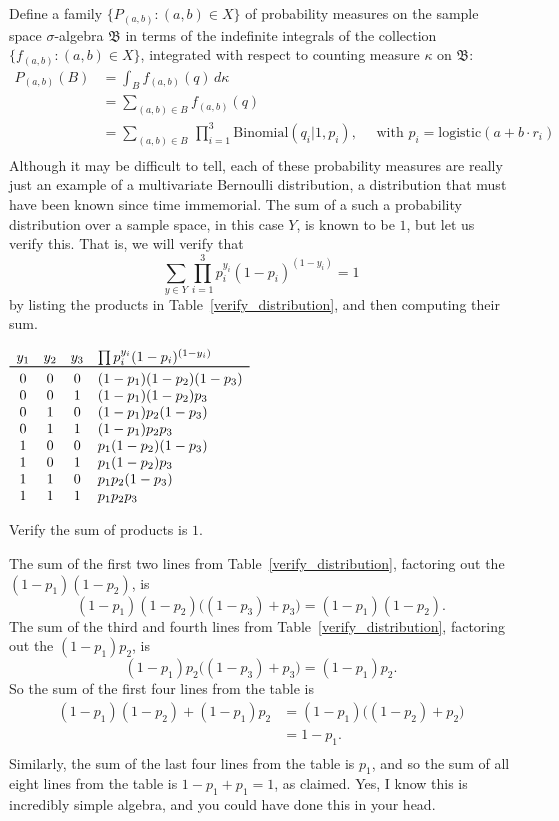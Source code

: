 \documentclass[
twoside=true,
paper=letter,
fontsize=9pt,
pagesize=auto,
leqno,
openany,
headsepline,
overfullrule,
]{scrbook}
\theoremstyle{plain}
\theoremstyle{plain}
\theoremstyle{definition}
\theoremstyle{bfnoteitalic}
\theoremstyle{bfnoteroman}
\newcommand{\sigalg}[1]{\mathfrak{#1}}
\newcommand{\textsigma}{\hbox{\large{$\sigma$}}\kern-1pt}
\newcommand{\funcf}{f}
\newcommand{\function}{f}
\newcommand{\measurespace}{X}
\newcommand{\measurespaceii}{Y}
\newcommand{\setii}{B}
\newcommand{\pspace}{\measurespace}%
\newcommand{\sspace}{\measurespaceii}%
\newcommand{\sspacesig}{\sigalg{B}}
\begin{document}
Define a family $\{P_{(a,b)}:(a,b)\in\pspace\}$ of probability measures on the sample space \textsigma-algebra
$\sspacesig$ in terms of the indefinite integrals of the collection
$\{ \function_{(a,b)} : (a,b)\in\pspace \}$, integrated with respect to counting measure $\kappa$ on
$\sspacesig$:
\begin{align*}
P_{(a,b)} (\setii)
& =
\int_\setii \funcf_{(a,b)}(q)\, d\kappa \\
& =
\sum_{(a,b)\in\setii} f_{(a,b)}(q) \\
& =
\sum_{(a,b)\in\setii}
\,
\prod_{i=1}^{3}
\text{Binomial}(q_i \vert 1, p_i),\quad
\text{ with $p_i = \text{logistic}(a  + b\cdot r_i )$} \\
\end{align*}
Although it may be difficult to tell, each of these probability measures are really just an example of a  multivariate Bernoulli distribution, a distribution that must have been known since time immemorial.  The sum of a such a probability distribution over a sample space, in this case $\sspace$, is known to be $1$, but let us verify this.
That is, we will verify that
\[
\sum_{y\in Y}\prod_{i=1}^3 p_i^{y_i}(1-p_i)^{(1-y_i)}
=
1
\]
by listing the products in Table~\ref{verify_distribution}, and then computing their sum.
\begin{table}
\centering
\renewcommand{\arraystretch}{1.1}
$\begin{array}{cccl}
y_1 & y_2 & y_3 & \prod p_i^{y_i} (1-p_i)^{(1-y_i)} \\
\toprule
0 & 0 & 0 & (1-p_1)(1-p_2)(1-p_3) \\
0 & 0 & 1 & (1-p_1)(1-p_2)p_3 \\
0 & 1 & 0 & (1-p_1)p_2(1-p_3) \\
0 & 1 & 1 & (1-p_1)p_2 p_3 \\
1 & 0 & 0 & p_1 (1-p_2) (1-p_3) \\
1 & 0 & 1 & p_1 (1-p_2) p_3 \\
1 & 1 & 0 & p_1 p_2 (1-p_3) \\
1 & 1 & 1 & p_1 p_2 p_3 \\
\end{array}$
\caption{Verify the sum of products is $1$.}\label{verify_distribution}
\end{table}

The sum of the first two lines from Table~\ref{verify_distribution}, factoring out the
$(1 - p_1) (1 - p_2)$, is
\[
(1 - p_1) (1 - p_2) \bigl((1-p_3) + p_3\bigr)
=
(1 - p_1) (1 - p_2).
\]
The sum of the third and fourth lines from Table~\ref{verify_distribution}, factoring out the
$(1-p_1)p_2$,  is
\[
(1-p_1)p_2\bigl((1-p_3)+p_3\bigr)
=
(1-p_1)p_2.
\]
So the sum of the first four lines from the table is
\begin{align*}
(1 - p_1) (1 - p_2)
+
(1-p_1)p_2
& =
(1-p_1)\bigl( (1-p_2) + p_2 \bigr) \\
& = 1 - p_1.\\
\end{align*}
Similarly, the sum of the last four lines from the table is $p_1$, and so the sum of all eight lines from the table is
$1 - p_1 + p_1 = 1$, as claimed. Yes, I know this is incredibly simple algebra, and you could have done this in your head.
\end{document}
